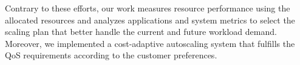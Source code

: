 Contrary to these efforts, our work measures resource performance using the allocated resources and analyzes applications and system metrics to select the scaling plan that better handle the current and future workload demand. Moreover, we implemented a cost-adaptive autoscaling system that fulfills the QoS requirements according to the customer preferences.


















